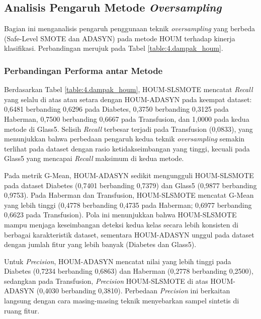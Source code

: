 \subsection{Analisis Pengaruh Metode \textit{Oversampling}} \label{IV.Pengaruh_Oversampling}
Bagian ini menganalisis pengaruh penggunaan teknik \textit{oversampling} yang berbeda (Safe-Level SMOTE dan ADASYN) pada metode HOUM terhadap kinerja klasifikasi. Perbandingan merujuk pada Tabel \ref{table:4.dampak_houm}. \par

\subsubsection{Perbandingan Performa antar Metode}
Berdasarkan Tabel \ref{table:4.dampak_houm}, HOUM-SLSMOTE mencatat \textit{Recall} yang selalu di atas atau setara dengan HOUM-ADASYN pada keempat dataset: 0,6481 berbanding 0,6296 pada Diabetes, 0,3750 berbanding 0,3125 pada Haberman, 0,7500 berbanding 0,6667 pada Transfusion, dan 1,0000 pada kedua metode di Glass5. Selisih \textit{Recall} terbesar terjadi pada Transfusion (0,0833), yang menunjukkan bahwa perbedaan pengaruh kedua teknik \textit{oversampling} semakin terlihat pada dataset dengan rasio ketidakseimbangan yang tinggi, kecuali pada Glass5 yang mencapai \textit{Recall} maksimum di kedua metode. \par

Pada metrik G-Mean, HOUM-ADASYN sedikit mengungguli HOUM-SLSMOTE pada dataset Diabetes (0,7401 berbanding 0,7379) dan Glass5 (0,9877 berbanding 0,9753). Pada Haberman dan Transfusion, HOUM-SLSMOTE mencatat G-Mean yang lebih tinggi (0,4778 berbanding 0,4735 pada Haberman; 0,6977 berbanding 0,6623 pada Transfusion). Pola ini menunjukkan bahwa HOUM-SLSMOTE mampu menjaga keseimbangan deteksi kedua kelas secara lebih konsisten di berbagai karakteristik dataset, sementara HOUM-ADASYN unggul pada dataset dengan jumlah fitur yang lebih banyak (Diabetes dan Glass5). \par

Untuk \textit{Precision}, HOUM-ADASYN mencatat nilai yang lebih tinggi pada Diabetes (0,7234 berbanding 0,6863) dan Haberman (0,2778 berbanding 0,2500), sedangkan pada Transfusion, \textit{Precision} HOUM-SLSMOTE di atas HOUM-ADASYN (0,4030 berbanding 0,3810). Perbedaan \textit{Precision} ini berkaitan langsung dengan cara masing-masing teknik menyebarkan sampel sintetis di ruang fitur. \par

